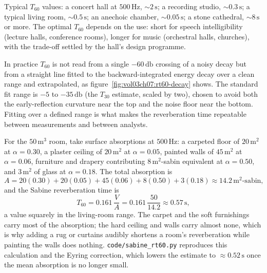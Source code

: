 Typical $T_{60}$ values: a concert hall at $500\,\si{\hertz}$, $\sim
2\,\si{\second}$; a recording studio, $\sim 0.3\,\si{\second}$; a
typical living room, $\sim 0.5\,\si{\second}$; an anechoic chamber,
$\sim 0.05\,\si{\second}$; a stone cathedral, $\sim 8\,\si{\second}$
or more. The optimal $T_{60}$ depends on the use: short for speech
intelligibility (lecture halls, conference rooms), longer for music
(orchestral halls, churches), with the trade-off settled by the
hall's design programme.

In practice $T_{60}$ is not read from a single $-60\,\si{\decibel}$
crossing of a noisy decay but from a straight line fitted to the
backward-integrated energy decay over a clean range and extrapolated,
as figure~\ref{fig:vol03ch07:rt60-decay} shows. The standard fit range
is $-5$ to $-35\,\si{\decibel}$ (the $T_{30}$ estimate, scaled by two),
chosen to avoid both the early-reflection curvature near the top and
the noise floor near the bottom. Fitting over a defined range is what
makes the reverberation time repeatable between measurements and
between analysts.



\begin{example}
For the $50\,\si{\meter\cubed}$ room, take surface absorptions at
$500\,\si{\hertz}$: a carpeted floor of $20\,\si{\meter\squared}$ at
$\alpha=0.30$, a plaster ceiling of $20\,\si{\meter\squared}$ at
$\alpha=0.05$, painted walls of $45\,\si{\meter\squared}$ at
$\alpha=0.06$, furniture and drapery contributing
$8\,\si{\meter\squared}$-sabin equivalent at $\alpha=0.50$, and
$3\,\si{\meter\squared}$ of glass at $\alpha=0.18$. The total
absorption is
\[
A = 20(0.30) + 20(0.05) + 45(0.06) + 8(0.50) + 3(0.18)
  \approx 14.2\,\si{\meter\squared}\text{-sabin},
\]
and the Sabine reverberation time is
\[
T_{60} = 0.161\,\frac{V}{A} = 0.161\,\frac{50}{14.2}
       \approx 0.57\,\si{\second},
\]
a value squarely in the living-room range. The carpet and the soft
furnishings carry most of the absorption; the hard ceiling and walls
carry almost none, which is why adding a rug or curtains audibly
shortens a room's reverberation while painting the walls does nothing.
\texttt{code/sabine\_rt60.py} reproduces this calculation and the
Eyring correction, which lowers the estimate to
$\approx 0.52\,\si{\second}$ once the mean absorption is no longer
small.
\end{example}

